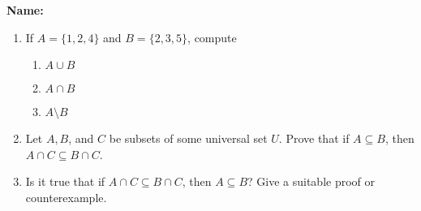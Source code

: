 \documentclass[12pt]{article}
\newcommand{\points}[1]{\marginpar{\hspace{24pt}[#1]}}
\begin{document}
{\bf Name:}
\thispagestyle{fancy}

\bigskip

\begin{enumerate}
 \item If $A=\{1,2,4\}$ and $B=\{2,3,5\}$, compute
\begin{enumerate}
 \item $A\cup B$ \points{1}

\vspace{0.5in}

 \item $A\cap B$ \points{1}

\vspace{0.5in}

 \item $A\setminus B$ \points{1}

\vspace{0.5in}
\end{enumerate}
\item Let $A, B$, and $C$ be subsets of some universal set $U$. Prove that if $A\subseteq B$, then\\
 $A\cap C\subseteq B\cap C$. \points{4}

\vspace{3in}

\item Is it true that if $A\cap C\subseteq B\cap C$, then $A\subseteq B$? Give a suitable proof or counterexample. \points{3}
\end{enumerate}
\end{document}
